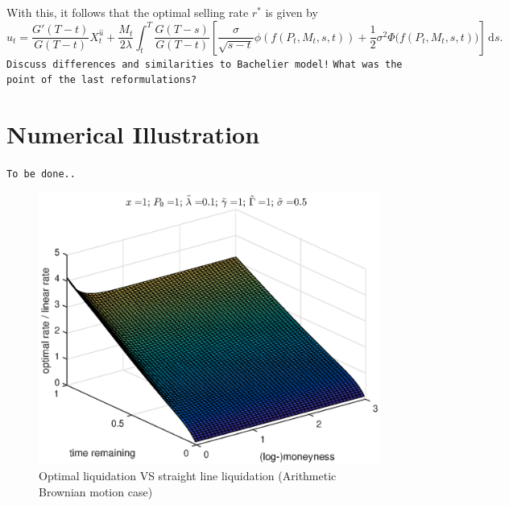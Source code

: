 \documentclass[11pt]{article}
\theoremstyle{definition}
\theoremstyle{remark}
\newcommand{\ts}{\textstyle}
\newcommand{\de}{\,\mathrm{d}}
\begin{document}
With this, it follows that the optimal selling rate $r^*$ is given by
\[
 \hat{u}_t = \frac{G'(T-t)}{G(T-t)} X^{\hat{u}}_t + \frac{M_t}{2\lambda}\int_t^T  \frac{G(T-s)}{G(T-t)} \left[ \frac{\sigma}{\sqrt{s-t}}\phi\left(f(P_t,M_t,s,t)\right)+\frac{1}{2}\sigma^2 \Phi\bigl(f(P_t,M_t,s,t)\bigr)\right] \de s.
\]
\texttt{Discuss differences and similarities to Bachelier model!}
\texttt{What was the point of the last reformulations?}

\section{Numerical Illustration}

\texttt{To be done..}

\begin{figure}
\includegraphics[]{ABM_lin.eps}
\caption{Optimal liquidation VS straight line liquidation (Arithmetic Brownian motion case)}
\label{fig:ABM_lin}
\end{figure}
\end{document}
